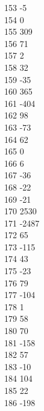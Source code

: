 { 153	-5 \\
 154	0 \\
 155	309 \\
 156	71 \\
 157	2 \\
 158	32 \\
 159	-35 \\
 160	365 \\
 161	-404 \\
 162	98 \\
 163	-73 \\
 164	62 \\
 165	0 \\
 166	6 \\
 167	-36 \\
 168	-22 \\
 169	-21 \\
 170	2530 \\
 171	-2487 \\
 172	65 \\
 173	-115 \\
 174	43 \\
 175	-23 \\
 176	79 \\
 177	-104 \\
 178	1 \\
 179	58 \\
 180	70 \\
 181	-158 \\
 182	57 \\
 183	-10 \\
 184	104 \\
 185	22 \\
 186	-198 \\
}
